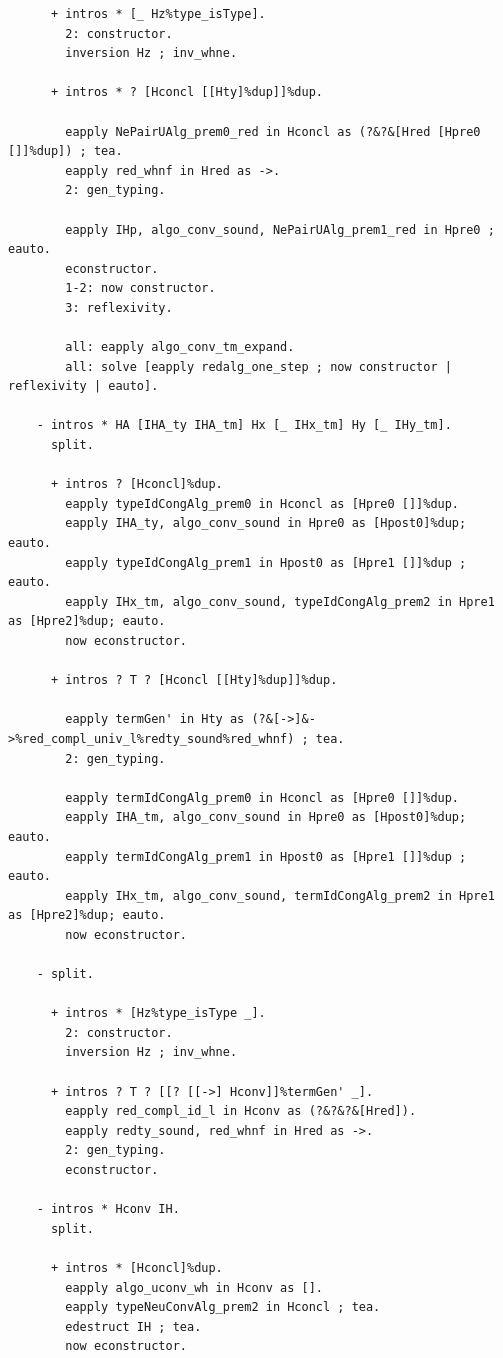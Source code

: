\documentclass[10pt,a4paper]{amsart}
\begin{document}
\begin{lstlisting}
      + intros * [_ Hz%type_isType].
        2: constructor.
        inversion Hz ; inv_whne.

      + intros * ? [Hconcl [[Hty]%dup]]%dup.

        eapply NePairUAlg_prem0_red in Hconcl as (?&?&[Hred [Hpre0 []]%dup]) ; tea.
        eapply red_whnf in Hred as ->.
        2: gen_typing.

        eapply IHp, algo_conv_sound, NePairUAlg_prem1_red in Hpre0 ; eauto.
        econstructor.
        1-2: now constructor.
        3: reflexivity.

        all: eapply algo_conv_tm_expand.
        all: solve [eapply redalg_one_step ; now constructor | reflexivity | eauto].
        
    - intros * HA [IHA_ty IHA_tm] Hx [_ IHx_tm] Hy [_ IHy_tm].
      split.

      + intros ? [Hconcl]%dup.
        eapply typeIdCongAlg_prem0 in Hconcl as [Hpre0 []]%dup.
        eapply IHA_ty, algo_conv_sound in Hpre0 as [Hpost0]%dup; eauto.
        eapply typeIdCongAlg_prem1 in Hpost0 as [Hpre1 []]%dup ; eauto. 
        eapply IHx_tm, algo_conv_sound, typeIdCongAlg_prem2 in Hpre1 as [Hpre2]%dup; eauto.
        now econstructor.

      + intros ? T ? [Hconcl [[Hty]%dup]]%dup.

        eapply termGen' in Hty as (?&[->]&->%red_compl_univ_l%redty_sound%red_whnf) ; tea.
        2: gen_typing.

        eapply termIdCongAlg_prem0 in Hconcl as [Hpre0 []]%dup.
        eapply IHA_tm, algo_conv_sound in Hpre0 as [Hpost0]%dup; eauto.
        eapply termIdCongAlg_prem1 in Hpost0 as [Hpre1 []]%dup ; eauto. 
        eapply IHx_tm, algo_conv_sound, termIdCongAlg_prem2 in Hpre1 as [Hpre2]%dup; eauto.
        now econstructor.

    - split.
  
      + intros * [Hz%type_isType _].
        2: constructor.
        inversion Hz ; inv_whne.

      + intros ? T ? [[? [[->] Hconv]]%termGen' _].
        eapply red_compl_id_l in Hconv as (?&?&?&[Hred]).
        eapply redty_sound, red_whnf in Hred as ->.
        2: gen_typing.
        econstructor.
      
    - intros * Hconv IH.
      split.
      
      + intros * [Hconcl]%dup.
        eapply algo_uconv_wh in Hconv as [].
        eapply typeNeuConvAlg_prem2 in Hconcl ; tea.
        edestruct IH ; tea.
        now econstructor.


\end{lstlisting}
\end{document}
